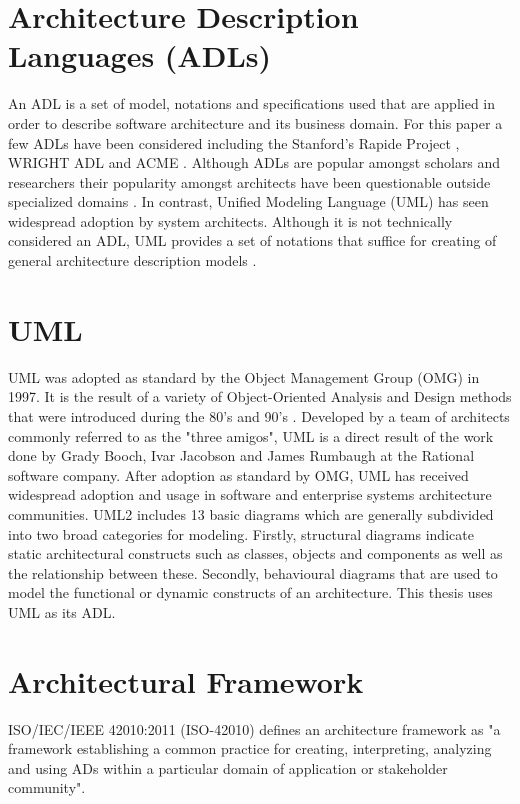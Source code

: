 \section{Architecture Description Languages (ADLs)}

An ADL is a set of model, notations and specifications used that are applied in order to describe software architecture and its business domain. For this paper a few ADLs have been considered including the Stanford's Rapide Project \cite{Luckham1996}, WRIGHT ADL \cite{Allen1997} and ACME \cite{bjorn}. Although ADLs are popular amongst scholars and researchers their popularity amongst architects have been questionable outside specialized domains \cite{Woods2005}. In contrast, Unified Modeling Language (UML) has seen widespread adoption by system architects. Although it is not technically considered an ADL, UML provides a set of notations that suffice for creating of general architecture description models \cite{Woods2005}.

\section{UML}

UML was adopted as standard by the Object Management Group (OMG) in 1997. It is the result of a variety of Object-Oriented Analysis and Design methods that were introduced during the 80's and 90's \cite{Fowler2004}. Developed by a team of architects commonly referred to as the "three amigos", UML is a direct result of the work done by Grady Booch, Ivar Jacobson and James Rumbaugh at the Rational software company. After adoption as standard by OMG, UML has received widespread adoption and usage in software and enterprise systems architecture communities. UML2 includes 13 basic diagrams which are generally subdivided into two broad categories for modeling. Firstly, structural diagrams indicate static architectural constructs such as classes, objects and components as well as the relationship between these. Secondly, behavioural diagrams that are used to model the functional or dynamic constructs of an architecture. This thesis uses UML as its ADL.


\section{Architectural Framework}

ISO/IEC/IEEE 42010:2011 (ISO-42010) defines an architecture framework as "a framework establishing a common practice for creating, interpreting, analyzing and using ADs within a particular domain of application or stakeholder community".

